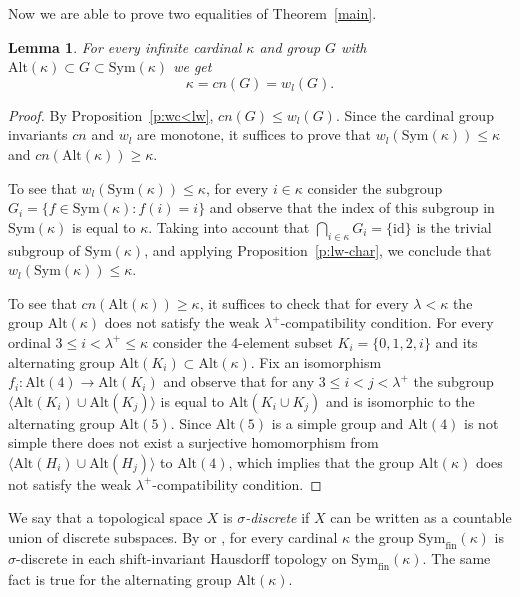 \documentclass[11pt, twoside]{amsart}
\newtheorem{lemma}[theorem]{Lemma}
\theoremstyle{definition}
\begin{document}
Now we are able to prove two equalities of Theorem~\ref{main}.

\begin{lemma}\label{l1} For every infinite cardinal $\kappa$ and group $G$ with ${\mathrm{Alt}}(\kappa)\subset G\subset {\mathrm{Sym}}(\kappa)$ we get $$ \kappa={cn}(G)=w_l(G).$$
\end{lemma}

\begin{proof} By Proposition~\ref{p:wc<lw}, ${cn}(G)\le w_l(G)$. Since the cardinal group invariants ${cn}$ and $w_l$ are monotone, it suffices to prove that $w_l({\mathrm{Sym}}(\kappa))\le\kappa$ and ${cn}({\mathrm{Alt}}(\kappa))\ge\kappa$.

To see that $w_l({\mathrm{Sym}}(\kappa))\le\kappa$, for every $i\in \kappa$ consider the subgroup $G_i=\{f\in{\mathrm{Sym}}(\kappa):f(i)=i\}$ and observe that the index of this subgroup in ${\mathrm{Sym}}(\kappa)$ is equal to $\kappa$. Taking into account that
$\bigcap_{i\in\kappa}G_i=\{{\mathrm{id}}\}$ is the trivial subgroup of ${\mathrm{Sym}}(\kappa)$,  and applying Proposition~\ref{p:lw-char}, we conclude that $w_l({\mathrm{Sym}}(\kappa))\le\kappa$.

To see that ${cn}({\mathrm{Alt}}(\kappa))\ge\kappa$, it suffices to check that for every $\lambda<\kappa$ the group ${\mathrm{Alt}}(\kappa)$ does not satisfy the weak $\lambda^+$-compatibility condition.
For every ordinal $3\le i<\lambda^+\le\kappa$ consider the 4-element subset $K_i=\{0,1,2,i\}$ and its alternating group ${\mathrm{Alt}}(K_i)\subset {\mathrm{Alt}}(\kappa)$. Fix an isomorphism $f_i:{\mathrm{Alt}}(4)\to {\mathrm{Alt}}(K_i)$ and observe that for any $3\le i<j<\lambda^+$ the subgroup $\langle {\mathrm{Alt}}(K_i)\cup{\mathrm{Alt}}(K_j)\rangle$ is equal to ${\mathrm{Alt}}(K_i\cup K_j)$ and is isomorphic to the alternating group ${\mathrm{Alt}}(5)$.
Since ${\mathrm{Alt}}(5)$ is a simple group and ${\mathrm{Alt}}(4)$ is not
simple there does not exist
a surjective homomorphism from $\langle {\mathrm{Alt}}(H_i)\cup {\mathrm{Alt}}(H_j) \rangle$ to ${\mathrm{Alt}}(4)$, which implies that the group ${\mathrm{Alt}}(\kappa)$ does not satisfy the weak $\lambda^+$-compatibility condition.
\end{proof}

 We say that a topological space $X$ is {\em $\sigma$-discrete} if $X$ can be written as a countable union
of discrete subspaces. By \cite{BG} or \cite[6.1]{BGP}, for every cardinal $\kappa$ the group ${\mathrm{Sym}}_{\mathrm{fin}}(\kappa)$ is $\sigma$-discrete in each shift-invariant Hausdorff topology on ${\mathrm{Sym}}_{\mathrm{fin}}(\kappa)$. The same fact is true for the alternating group  ${\mathrm{Alt}}(\kappa)$.
\end{document}

